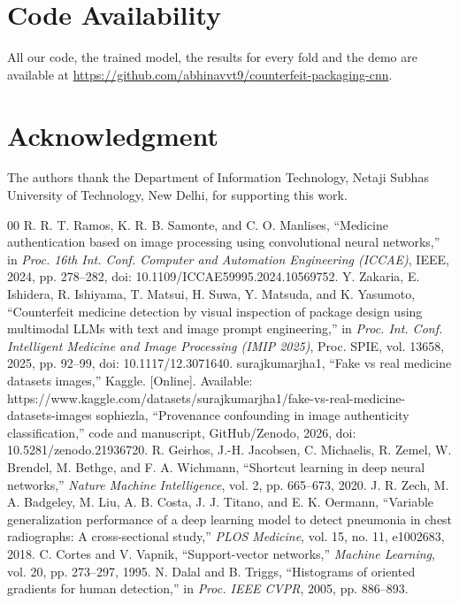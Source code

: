 \documentclass[conference]{IEEEtran}
\newcommand{\repourl}{https://github.com/abhinavvt9/counterfeit-packaging-cnn}
\begin{document}
\section*{Code Availability}
All our code, the trained model, the results for every fold and the demo are available at \url{\repourl}.

\section*{Acknowledgment}
The authors thank the Department of Information Technology, Netaji Subhas University of Technology, New Delhi, for supporting this work.

\balance
\begin{thebibliography}{00}
 R. R. T. Ramos, K. R. B. Samonte, and C. O. Manlises, ``Medicine authentication based on image processing using convolutional neural networks,'' in \textit{Proc. 16th Int. Conf. Computer and Automation Engineering (ICCAE)}, IEEE, 2024, pp. 278--282, doi: 10.1109/ICCAE59995.2024.10569752.
 Y. Zakaria, E. Ishidera, R. Ishiyama, T. Matsui, H. Suwa, Y. Matsuda, and K. Yasumoto, ``Counterfeit medicine detection by visual inspection of package design using multimodal LLMs with text and image prompt engineering,'' in \textit{Proc. Int. Conf. Intelligent Medicine and Image Processing (IMIP 2025)}, Proc. SPIE, vol. 13658, 2025, pp. 92--99, doi: 10.1117/12.3071640.
 surajkumarjha1, ``Fake vs real medicine datasets images,'' Kaggle. [Online]. Available: https://www.kaggle.com/datasets/surajkumarjha1/fake-vs-real-medicine-datasets-images
 sophiezla, ``Provenance confounding in image authenticity classification,'' code and manuscript, GitHub/Zenodo, 2026, doi: 10.5281/zenodo.21936720.
 R. Geirhos, J.-H. Jacobsen, C. Michaelis, R. Zemel, W. Brendel, M. Bethge, and F. A. Wichmann, ``Shortcut learning in deep neural networks,'' \textit{Nature Machine Intelligence}, vol. 2, pp. 665--673, 2020.
 J. R. Zech, M. A. Badgeley, M. Liu, A. B. Costa, J. J. Titano, and E. K. Oermann, ``Variable generalization performance of a deep learning model to detect pneumonia in chest radiographs: A cross-sectional study,'' \textit{PLOS Medicine}, vol. 15, no. 11, e1002683, 2018.
 C. Cortes and V. Vapnik, ``Support-vector networks,'' \textit{Machine Learning}, vol. 20, pp. 273--297, 1995.
 N. Dalal and B. Triggs, ``Histograms of oriented gradients for human detection,'' in \textit{Proc. IEEE CVPR}, 2005, pp. 886--893.

\end{thebibliography}
\end{document}
